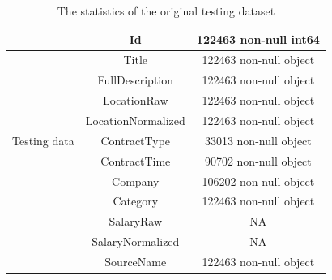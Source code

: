 \documentclass[12pt,journal,nofonttune]{IEEEtran}
\begin{document}
\begin{table}[htbp]
\centering
\caption{The statistics of the original testing dataset}
\label{test_data}
\begin{tabular}{|c|c|c|}
 \hline
   & Id                   & 122463 non-null int64  \\
 \hline
   & Title                & 122463 non-null object \\
 \hline
   & FullDescription      & 122463 non-null object \\
 \hline
   & LocationRaw          & 122463 non-null object \\
 \hline
   & LocationNormalized   & 122463 non-null object \\
 \hline
 Testing data & ContractType    & 33013 non-null object  \\
 \hline
   & ContractTime         & 90702 non-null object  \\
 \hline
   & Company              & 106202 non-null object \\
 \hline
   & Category             & 122463 non-null object \\
 \hline
   & SalaryRaw            & NA                     \\
 \hline
   & SalaryNormalized     & NA                     \\
 \hline
   & SourceName           & 122463 non-null object \\
 \hline
\end{tabular}
\end{table}
\end{document}
